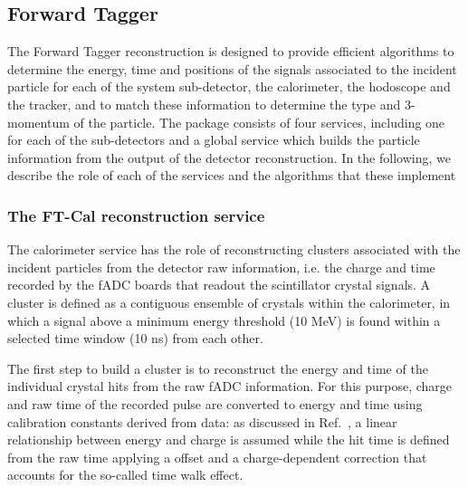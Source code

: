 \subsection{Forward Tagger}
The Forward Tagger reconstruction is designed to provide efficient algorithms to determine the energy, time and positions of the signals associated to the incident particle for each of the system sub-detector, the calorimeter, the hodoscope and the tracker, and to match these information to determine the type and 3-momentum of the particle. The package consists of four services, including one for each of the sub-detectors and a global service which builds the particle information from the output of the detector reconstruction. In the following, we describe the role of each of the services and the algorithms that these implement

\subsubsection{The FT-Cal reconstruction service}
The calorimeter service has the role of reconstructing clusters associated with the incident particles from the detector raw information, i.e. the charge and time recorded by the fADC boards that readout the scintillator crystal signals. A cluster is defined as a contiguous ensemble of crystals within the calorimeter, in which a signal above a minimum energy threshold (10 MeV) is found within a selected time window (10 ns) from each other.

The first step to build a cluster is to reconstruct the energy and time of the individual crystal hits from the raw fADC information. For this purpose, charge and raw time of the recorded pulse are converted to energy and time using calibration constants derived from data: as discussed in Ref.~\cite{ft-nim}, a linear relationship between energy and charge is assumed while the hit time is defined from the raw time applying a offset and a charge-dependent correction that accounts for the so-called time walk effect.

